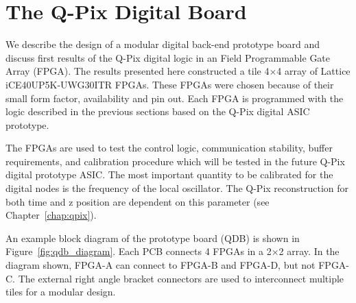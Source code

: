 \section{The Q-Pix Digital Board}
\label{sec:qdb_prototype}
We describe the design of a modular digital back-end prototype board and discuss first results of the Q-Pix digital logic in an Field Programmable Gate Array (FPGA).
The results presented here constructed a tile 4$\times$4 array of Lattice iCE40UP5K-UWG30ITR FPGAs.
These FPGAs were chosen because of their small form factor, availability and pin out.
Each FPGA is programmed with the logic described in the previous sections based on the Q-Pix digital ASIC prototype.

The FPGAs are used to test the control logic, communication stability, buffer requirements, and calibration procedure which will be tested in the future Q-Pix digital prototype ASIC.
The most important quantity to be calibrated for the digital nodes is the frequency of the local oscillator.
The Q-Pix reconstruction for both time and z position are dependent on this parameter (see Chapter~\ref{chap:qpix}).

An example block diagram of the prototype board (QDB) is shown in Figure~\ref{fig:qdb_diagram}.
Each PCB connects 4 FPGAs in a 2$\times$2 array.
In the diagram shown, FPGA-A can connect to FPGA-B and FPGA-D, but not FPGA-C.
The external right angle bracket connectors are used to interconnect multiple tiles for a modular design.

